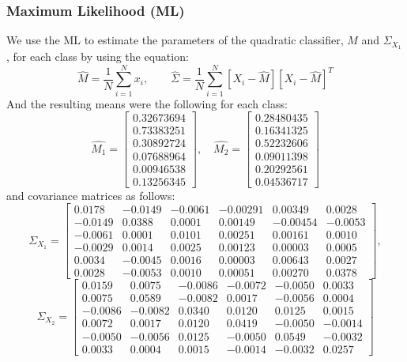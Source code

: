 \documentclass[11pt, oneside]{article}   	%
\begin{document}
\subsubsection*{Maximum Likelihood (ML)}
We use the ML to estimate the parameters of the quadratic classifier, $M$ and $\Sigma_{X_1}$, for each class by using the equation:
$$ \hat{M}= \frac{1}{N} \sum_{i=1}^{N} x_i, \quad\quad \hat{\Sigma}=	 \frac{1}{N} \sum_{i=1}^{N}[X_i-\hat{M}][X_i-\hat{M}]^T$$
And the resulting means were the following for each class:
$$\hat{M_1} = \begin{bmatrix}
0.32673694 \\ 0.73383251 \\ 0.30892724 \\ 0.07688964 \\ 0.00946538 \\ 0.13256345
\end{bmatrix},\quad \hat{M_2} = \begin{bmatrix}
0.28480435 \\ 0.16341325 \\ 0.52232606 \\ 0.09011398 \\ 0.20292561 \\ 0.04536717
\end{bmatrix}$$
  and covariance matrices as follows: 
  $$\Sigma_{X_1} = \begin{bmatrix}
  0.0178 &-0.0149& -0.0061& -0.00291&  0.00349 & 0.0028\\
 -0.0149&  0.0388&  0.0001&  0.00149& -0.00454 &-0.0053\\
 -0.0061 & 0.0001 & 0.0101 & 0.00251 & 0.00161 & 0.0010\\
 -0.0029 & 0.0014 & 0.0025 & 0.00123  &0.00003 & 0.0005\\
  0.0034 &-0.0045 & 0.0016 & 0.00003  &0.00643 & 0.0027\\
  0.0028 &-0.0053 & 0.0010 & 0.00051  &0.00270 & 0.0378
\end{bmatrix},$$ $$\Sigma_{X_2} = \begin{bmatrix}
  0.0159 & 0.0075 &-0.0086 &-0.0072& -0.0050 & 0.0033\\
  0.0075 & 0.0589 &-0.0082 & 0.0017& -0.0056 & 0.0004\\
 -0.0086 &-0.0082 & 0.0340 & 0.0120&  0.0125 & 0.0015\\
  0.0072 & 0.0017 & 0.0120 & 0.0419& -0.0050 &-0.0014\\
 -0.0050 &-0.0056 & 0.0125 &-0.0050&  0.0549 &-0.0032\\
  0.0033 & 0.0004 & 0.0015 &-0.0014& -0.0032 & 0.0257
\end{bmatrix}$$
\end{document}
